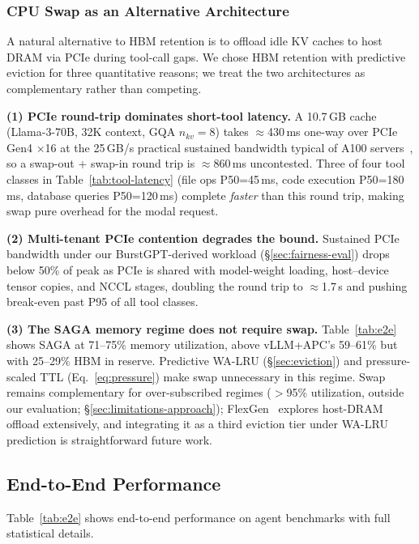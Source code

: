 \documentclass[sigconf]{acmart}
\newcommand{\sysname}{SAGA\xspace}
\begin{document}
\subsubsection{CPU Swap as an Alternative Architecture}
\label{sec:cpu-swap}

A natural alternative to HBM retention is to offload idle KV caches to host DRAM via PCIe during tool-call gaps. We chose HBM retention with predictive eviction for three quantitative reasons; we treat the two architectures as complementary rather than competing.

\textbf{(1) PCIe round-trip dominates short-tool latency.} A 10.7\,GB cache (Llama-3-70B, 32K context, GQA $n_{kv}=8$) takes $\approx$430\,ms one-way over PCIe Gen4 $\times$16 at the 25\,GB/s practical sustained bandwidth typical of A100 servers~\cite{patel2024splitwise}, so a swap-out + swap-in round trip is $\approx$860\,ms uncontested. Three of four tool classes in Table~\ref{tab:tool-latency} (file ops P50=45\,ms, code execution P50=180\,ms, database queries P50=120\,ms) complete \emph{faster} than this round trip, making swap pure overhead for the modal request.

\textbf{(2) Multi-tenant PCIe contention degrades the bound.} Sustained PCIe bandwidth under our BurstGPT-derived workload (\S\ref{sec:fairness-eval}) drops below 50\% of peak as PCIe is shared with model-weight loading, host--device tensor copies, and NCCL stages, doubling the round trip to $\approx$1.7\,s and pushing break-even past P95 of all tool classes.

\textbf{(3) The \sysname memory regime does not require swap.} Table~\ref{tab:e2e} shows \sysname at 71--75\% memory utilization, above vLLM+APC's 59--61\% but with 25--29\% HBM in reserve. Predictive WA-LRU (\S\ref{sec:eviction}) and pressure-scaled TTL (Eq.~\ref{eq:pressure}) make swap unnecessary in this regime. Swap remains complementary for over-subscribed regimes ($>$95\% utilization, outside our evaluation; \S\ref{sec:limitations-approach}); FlexGen~\cite{sheng2023flexgen} explores host-DRAM offload extensively, and integrating it as a third eviction tier under WA-LRU prediction is straightforward future work.

\subsection{End-to-End Performance}
\label{sec:e2e}

Table~\ref{tab:e2e} shows end-to-end performance on agent benchmarks with full statistical details.
\end{document}
